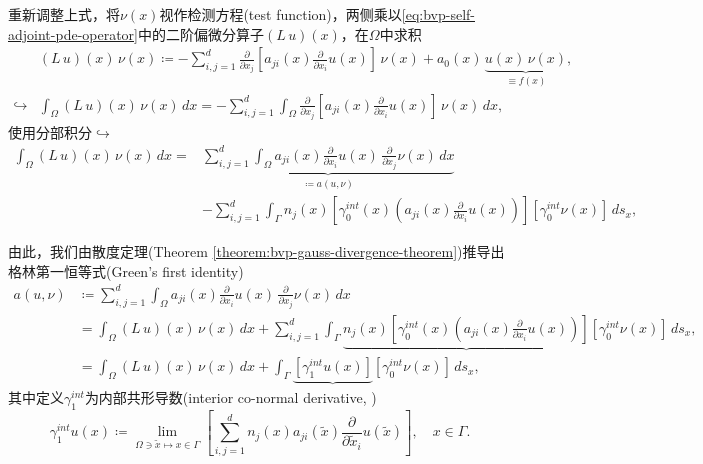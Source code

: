 重新调整上式，将$\nu(x)$视作检测方程(test function)，两侧乘以\eqref{eq:bvp-self-adjoint-pde-operator}中的二阶偏微分算子$\left(L\,u\right)(x)$，在$\Omega$中求积
\begin{equation}
  \begin{split}
    &\left( L \, u \right)(x) \, \nu(x) \coloneqq - \sum_{i,j=1}^d \frac{\partial}{\partial x_j} \left[ a_{ji} (x) \frac{\partial}{\partial x_i} u(x)\right] \, \nu(x) + a_0(x)\, \underbrace{u(x) \, \nu(x)}_{\equiv f(x)}, \\
    \hookrightarrow & \int_{\Omega} \left( L \, u \right)(x) \, \nu(x) \, dx = - \sum_{i,j=1}^d \int_{\Omega} \frac{\partial}{\partial x_j} \left[ a_{ji} (x) \frac{\partial}{\partial x_i} u(x)\right] \, \nu(x) \, dx,
  \end{split}
\end{equation}
使用分部积分$\hookrightarrow$
\begin{equation*}
  \begin{split}
    \int_{\Omega} \left( L \, u \right)(x) \, \nu(x) \, dx =&  \underbrace{\sum_{i,j=1}^d \int_{\Omega} a_{ji}(x) \frac{\partial}{\partial x_i} u(x) \, \frac{\partial}{\partial x_j} \nu(x) \, dx}_{\coloneqq a\left(u,\nu \right)} \\
   &- \sum_{i,j=1}^{d} \int_{\Gamma} n_j(x) \left[ \gamma_0^{int} (x) \left( a_{ji}(x) \frac{\partial}{\partial x_i} u(x)\right) \right] \left[ \gamma_0^{int} \nu(x) \right] \, d s_x,
  \end{split}
\end{equation*}

由此，我们由散度定理(Theorem \ref{theorem:bvp-gauss-divergence-theorem})推导出格林第一恒等式(Green's first identity)
\begin{equation}
  \label{eq:bvp-a-u-nu-inner-prod}
  \begin{split}
  a\left(u,\nu \right) &\coloneqq \sum_{i,j=1}^d \int_{\Omega} a_{ji}(x) \frac{\partial}{\partial x_i} u(x) \, \frac{\partial}{\partial x_j} \nu(x) \, dx \\
  & = \int_{\Omega} \left( L \, u \right)(x) \, \nu(x) \, dx + \sum_{i,j=1}^{d} \int_{\Gamma} \underbrace{n_j(x) \left[ \gamma_0^{int} (x) \left( a_{ji}(x) \frac{\partial}{\partial x_i} u(x)\right) \right]} \left[ \gamma_0^{int} \nu(x) \right] \, d s_x,\\
  & =\int_{\Omega} \left( L \, u \right)(x) \, \nu(x) \, dx + \int_{\Gamma} \underbrace{\left[ \gamma_1^{int} u(x) \right]} \left[ \gamma_0^{int} \nu(x) \right] \, d s_x,
  \end{split}
\end{equation}
其中定义$\gamma_1^{int}$为内部共形导数(interior co-normal derivative, \cite{Mikhailov:2006vo, Mikhailov:2009wj, Ancona:2009bo})
\begin{equation}
  \label{eq:bvp-int-conformal-derivative}
  \gamma_1^{int}u(x) \coloneqq \lim_{\Omega \owns \tilde{x} \mapsto x \in \Gamma} \left[
\sum_{i,j=1}^{d} n_j(x) a_{ji}\left( \tilde{x} \right) \frac{\partial}{\partial \tilde{x}_i} u \left( \tilde{x} \right)
  \right], \quad x \in \Gamma.
\end{equation}


